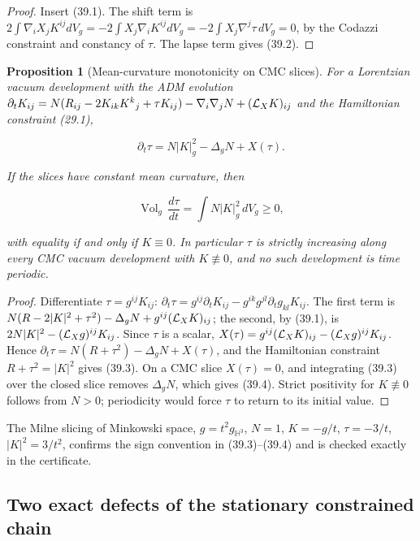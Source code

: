 \documentclass[11pt]{article}
\newtheorem{proposition}[theorem]{Proposition}
\theoremstyle{remark}
\begin{document}
\begin{proof}
Insert (39.1).  The shift term is
\(2\int\nabla_iX_jK^{ij}dV_g=-2\int X_j\nabla_iK^{ij}dV_g
=-2\int X_j\nabla^j\tau\,dV_g=0\), by the Codazzi constraint and
constancy of \(\tau\).  The lapse term gives (39.2).
\end{proof}

\begin{proposition}[Mean-curvature monotonicity on CMC slices]
\label{prop:v19v36-monotone}
For a Lorentzian vacuum development with the ADM evolution
\(\partial_tK_{ij}=N(R_{ij}-2K_{ik}K^k{}_j+\tau K_{ij})-\nabla_i\nabla_jN
+({\cal L}_XK)_{ij}\) and the Hamiltonian constraint (29.1),

\[
 \partial_t\tau=N|K|_g^2-\Delta_gN+X(\tau).                        \tag{39.3}
\]

If the slices have constant mean curvature, then

\[
 \operatorname{Vol}_g\,\frac{d\tau}{dt}=\int N|K|_g^2\,dV_g\geq0,   \tag{39.4}
\]

with equality if and only if \(K\equiv0\).  In particular \(\tau\) is
strictly increasing along every CMC vacuum development with \(K\not\equiv0\),
and no such development is time periodic.
\end{proposition}

\begin{proof}
Differentiate \(\tau=g^{ij}K_{ij}\):
\(\partial_t\tau=g^{ij}\partial_tK_{ij}-g^{ik}g^{jl}\partial_tg_{kl}K_{ij}\).
The first term is \(N(R-2|K|^2+\tau^2)-\Delta_gN+g^{ij}({\cal L}_XK)_{ij}\);
the second, by (39.1), is \(2N|K|^2-({\cal L}_Xg)^{ij}K_{ij}\).  Since
\(\tau\) is a scalar, \(X(\tau)=g^{ij}({\cal L}_XK)_{ij}-({\cal L}_Xg)^{ij}K_{ij}\).
Hence \(\partial_t\tau=N(R+\tau^2)-\Delta_gN+X(\tau)\), and the
Hamiltonian constraint \(R+\tau^2=|K|^2\) gives (39.3).  On a CMC slice
\(X(\tau)=0\), and integrating (39.3) over the closed slice removes
\(\Delta_gN\), which gives (39.4).  Strict positivity for \(K\not\equiv0\)
follows from \(N>0\); periodicity would force \(\tau\) to return to its
initial value.
\end{proof}

The Milne slicing of Minkowski space, \(g=t^2g_{\mathbb H^3}\),
\(N=1\), \(K=-g/t\), \(\tau=-3/t\), \(|K|^2=3/t^2\), confirms the sign
convention in (39.3)--(39.4) and is checked exactly in the certificate.

\subsection{Two exact defects of the stationary constrained chain}
\end{document}
